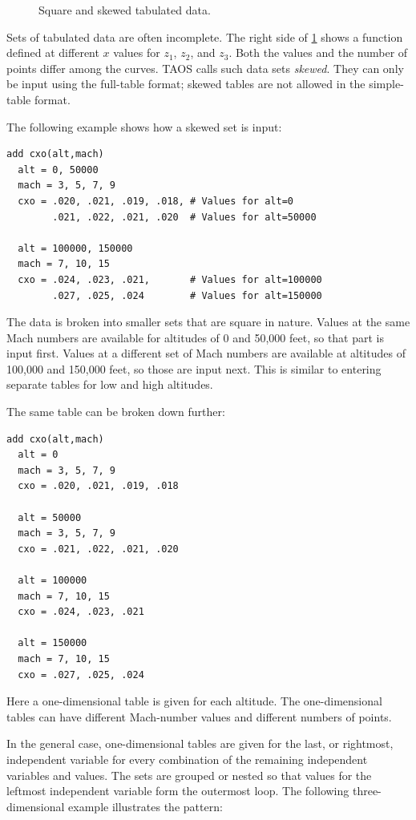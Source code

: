 \begin{figure}[htbp]
  \centering
  
  \caption{Square and skewed tabulated data.}
  \label{fig:square-skewed-data}
\end{figure}

Sets of tabulated data are often incomplete. The right side of
\cref{fig:square-skewed-data} shows a function defined at different $x$ values for
$z_1$, $z_2$, and $z_3$. Both the values and the number of points differ among the
curves. TAOS calls such data sets \emph{skewed}. They can only be input using the
full-table format; skewed tables are not allowed in the simple-table format.

The following example shows how a skewed set is input:

\begin{lstlisting}[style=taosmanual]
add cxo(alt,mach)
  alt = 0, 50000
  mach = 3, 5, 7, 9
  cxo = .020, .021, .019, .018, # Values for alt=0
        .021, .022, .021, .020  # Values for alt=50000

  alt = 100000, 150000
  mach = 7, 10, 15
  cxo = .024, .023, .021,       # Values for alt=100000
        .027, .025, .024        # Values for alt=150000
\end{lstlisting}

The data is broken into smaller sets that are square in nature. Values at the same
Mach numbers are available for altitudes of 0 and 50,000 feet, so that part is input
first. Values at a different set of Mach numbers are available at altitudes of 100,000
and 150,000 feet, so those are input next. This is similar to entering separate tables
for low and high altitudes.

The same table can be broken down further:

\begin{lstlisting}[style=taosmanual]
add cxo(alt,mach)
  alt = 0
  mach = 3, 5, 7, 9
  cxo = .020, .021, .019, .018

  alt = 50000
  mach = 3, 5, 7, 9
  cxo = .021, .022, .021, .020

  alt = 100000
  mach = 7, 10, 15
  cxo = .024, .023, .021

  alt = 150000
  mach = 7, 10, 15
  cxo = .027, .025, .024
\end{lstlisting}

Here a one-dimensional table is given for each altitude. The one-dimensional tables
can have different Mach-number values and different numbers of points.

In the general case, one-dimensional tables are given for the last, or rightmost,
independent variable for every combination of the remaining independent variables
and values. The sets are grouped or nested so that values for the leftmost
independent variable form the outermost loop. The following three-dimensional
example illustrates the pattern:

